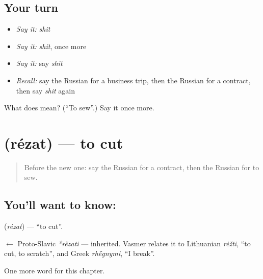\subsection*{Your turn}
\begin{itemize}
\raggedright
  \item \emph{Say it:} \emph{shit}
  \item \emph{Say it:} \emph{shit}, once more
  \item \emph{Say it:} say \emph{shit}
  \item \emph{Recall:} say the Russian for a business trip, then the Russian for a contract, then say \emph{shit} again
\end{itemize}

\begin{tcolorbox}[breakable,colback=teal!4,colframe=teal!35!black,title={Before you move on}]
What does  mean? (\textquotedblleft{}To sew\textquotedblright{}.) Say it once more.
\end{tcolorbox}
\section[\texorpdfstring{\ru{резать} (rézat)}{резать (rézat)}]{ (rézat) — to cut}

\label{lesson:RU-C173-rezat}



\begin{quote}
Before the new one: say the Russian for a contract, then the Russian for to sew.
\end{quote}

\subsection*{You'll want to know: }
\textbf{} (\emph{rézat}) — \textquotedblleft{}to cut\textquotedblright{}.

\begin{cousinweb}
\textbf{} $\leftarrow$ Proto-Slavic \emph{*rězati} — inherited. Vasmer relates it to Lithuanian \emph{rėžti}, \textquotedblleft{}to cut, to scratch\textquotedblright{}, and Greek \emph{rh\'{\={e}}gnymi}, \textquotedblleft{}I break\textquotedblright{}.
\end{cousinweb}

\begin{grammarlens}[title={What you've built}]
One more word for this chapter.
\end{grammarlens}

